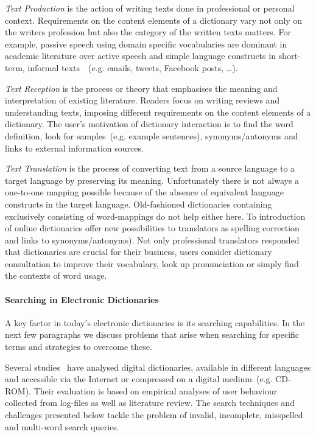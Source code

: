 \documentclass[draft,final]{vutinfth} %
\begin{document}
\textit{Text Production} is the action of writing texts done in professional or personal context. Requirements on the content elements of a dictionary vary not only on the writers profession but also the category of the written texts matters. For example, passive speech using domain specific vocabularies are dominant in academic literature over active speech and simple language constructs in short-term, informal texts~\cite{o2010routledge}~(e.g. emails, tweets, Facebook posts, \ldots).

\textit{Text Reception} is the process or theory that emphasises the meaning and interpretation of existing literature. Readers focus on writing reviews and understanding texts, imposing different requirements on the content elements of a dictionary. The user's motivation of dictionary interaction is to find the word definition, look for samples~(e.g. example sentences), synonyms/antonyms and links to external information sources. 

\textit{Text Translation} is the process of converting text from a source language to a target language by preserving its meaning. Unfortunately there is not always a one-to-one mapping possible because of the absence of equivalent language constructs in the target language. Old-fashioned dictionaries containing exclusively consisting of word-mappings do not help either here. To introduction of online dictionaries offer new possibilities to translators as spelling correction and links to synonyms/antonyms). Not only professional translators responded that dictionaries are crucial for their business, users consider dictionary consultation to improve their vocabulary, look up pronunciation or simply find the contexts of word usage. 

\paragraph{Searching in Electronic Dictionaries} A key factor in today's electronic dictionaries is its searching capabilities. In the next few paragraphs we discuss problems that arise when searching for specific terms and strategies to overcome these. 

Several studies~\cite{pastor2010, mvechura2008} have analysed digital dictionaries, available in different languages and accessible via the Internet or compressed on a digital medium~(e.g. CD-ROM). Their evaluation is based on empirical analyses of user behaviour collected from log-files as well as literature review. The search techniques and challenges presented below tackle the problem of invalid, incomplete, misspelled and multi-word search queries.
\end{document}
